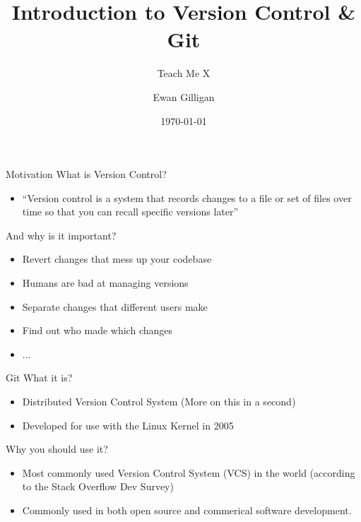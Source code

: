\documentclass{beamer}
\title{Introduction to Version Control \& Git}
\subtitle{Teach Me X}
\author{Ewan Gilligan}
\date{\today}
\begin{document}

\begin{frame}
	\maketitle %
\end{frame}

\begin{frame}{Motivation}
What is Version Control?
    \begin{itemize}
        \item ``Version control is a system that records changes to a file or set of files over time so that you can recall specific versions later'' \cite{10.5555/2695634}
    \end{itemize}
And why is it important?
    \begin{itemize}
        \item Revert changes that mess up your codebase
        \item Humans are bad at managing versions
        \item Separate changes that different users make
        \item Find out who made which changes
        \item ...
    \end{itemize}
\end{frame}

\begin{frame}{Git}
What it is?
\begin{itemize}
    \item Distributed Version Control System (More on this in a second)
    \item Developed for use with the Linux Kernel in 2005
\end{itemize}
Why you should use it?
\begin{itemize}
    \item Most commonly used Version Control System (VCS) in the world (according to the Stack Overflow Dev Survey)
    \item Commonly used in both open source and commerical software development.
\end{itemize}
    
\end{frame}
\end{document}

